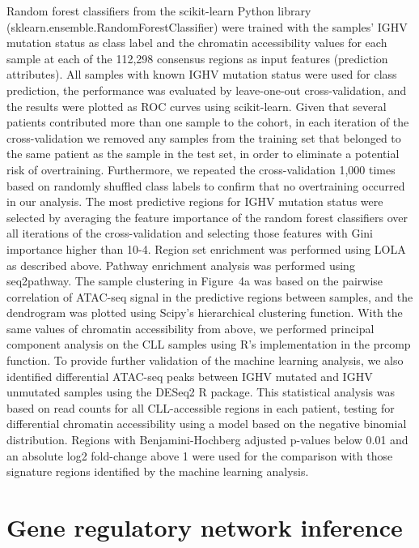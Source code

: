 \documentclass[10pt,]{article}
\begin{document}
Random forest classifiers from the scikit-learn\citep{Pedregosa2011}
Python library (sklearn.ensemble.RandomForestClassifier) were trained
with the samples' IGHV mutation status as class label and the chromatin
accessibility values for each sample at each of the 112,298 consensus
regions as input features (prediction attributes). All samples with
known IGHV mutation status were used for class prediction, the
performance was evaluated by leave-one-out cross-validation, and the
results were plotted as ROC curves using scikit-learn. Given that
several patients contributed more than one sample to the cohort, in each
iteration of the cross-validation we removed any samples from the
training set that belonged to the same patient as the sample in the test
set, in order to eliminate a potential risk of overtraining.
Furthermore, we repeated the cross-validation 1,000 times based on
randomly shuffled class labels to confirm that no overtraining occurred
in our analysis. The most predictive regions for IGHV mutation status
were selected by averaging the feature importance of the random forest
classifiers over all iterations of the cross-validation and selecting
those features with Gini importance higher than 10-4. Region set
enrichment was performed using LOLA\citep{Sheffield2015} as described
above. Pathway enrichment analysis was performed using
seq2pathway\citep{Wang2015}. The sample clustering in Figure~4a was
based on the pairwise correlation of ATAC-seq signal in the predictive
regions between samples, and the dendrogram was plotted using Scipy's
hierarchical clustering function. With the same values of chromatin
accessibility from above, we performed principal component analysis on
the CLL samples using R's implementation in the prcomp function. To
provide further validation of the machine learning analysis, we also
identified differential ATAC-seq peaks between IGHV mutated and IGHV
unmutated samples using the DESeq2 R package\citep{Love2014}. This
statistical analysis was based on read counts for all CLL-accessible
regions in each patient, testing for differential chromatin
accessibility using a model based on the negative binomial distribution.
Regions with Benjamini-Hochberg adjusted p-values below 0.01 and an
absolute log2 fold-change above 1 were used for the comparison with
those signature regions identified by the machine learning analysis.

\section{Gene regulatory network
inference}\label{gene-regulatory-network-inference}
\end{document}

